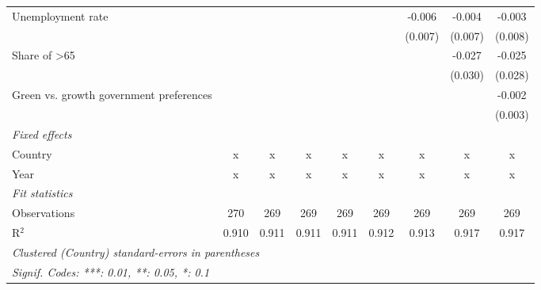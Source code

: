 \begin{table}[htbp]
\begin{tabular}{lcccccccc}
      Unemployment rate                                        &         &         &         &         &         & -0.006  & -0.004  & -0.003\\   
                                                               &         &         &         &         &         & (0.007) & (0.007) & (0.008)\\   
      Share of >65                                             &         &         &         &         &         &         & -0.027  & -0.025\\   
                                                               &         &         &         &         &         &         & (0.030) & (0.028)\\   
      Green vs. growth government preferences                  &         &         &         &         &         &         &         & -0.002\\   
                                                               &         &         &         &         &         &         &         & (0.003)\\   
      \emph{Fixed effects}\\
      Country                                                  & x       & x       & x       & x       & x       & x       & x       & x\\  
      Year                                                     & x       & x       & x       & x       & x       & x       & x       & x\\  
      \midrule \emph{Fit statistics}\\
      Observations                                             & 270     & 269     & 269     & 269     & 269     & 269     & 269     & 269\\  
      R$^2$                                                    & 0.910   & 0.911   & 0.911   & 0.911   & 0.912   & 0.913   & 0.917   & 0.917\\  
      \midrule
      \multicolumn{9}{l}{\emph{Clustered (Country) standard-errors in parentheses}}\\
      \multicolumn{9}{l}{\emph{Signif. Codes: ***: 0.01, **: 0.05, *: 0.1}}\\
   \end{tabular}
\end{table}


